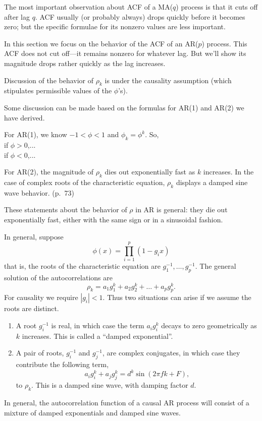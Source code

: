 \documentclass[12pt]{article}
\begin{document}
The most important observation about ACF of a MA($q$)
process is that it cuts off after lag $q$.
ACF usually (or probably always) drops quickly before it becomes zero;
but the specific formulae for its nonzero values are less important.

In this section we focus on the behavior of the ACF of an AR($p$)
process.
This ACF does not cut off---it remains nonzero for whatever lag.
But we'll show its magnitude drops rather quickly as the lag increases.

Discussion of the behavior of $\rho_k$ is under the causality assumption
(which stipulates permissible values of the $\phi$'s).

Some discussion can be made based on the formulas for
AR(1) and AR(2) we have derived.

For AR(1), we know $-1 < \phi < 1$ and $\phi_k = \phi^k$.
So,\\
if $\phi > 0$,...\\
if $\phi < 0$,...

For AR(2), the magnitude of $\rho_k$ dies out exponentially fast as $k$
increases. In the case of complex roots of the characteristic equation,
$\rho_k$ displays a damped sine wave behavior. (p.~73)

These statements about the behavior of $\rho$ in AR is general:
they die out exponentially fast,
either with the same sign or in a sinusoidal fashion.

In general,
suppose
\[
\phi(x) = \prod_{i=1}^p (1 - g_i x)
\]
that is,
the roots of the characteristic equation are
$g_1^{-1},\dotsc,g_p^{-1}$.
The general solution of the autocorrelations are
\[
\rho_k = a_1 g_1^k + a_2 g_2^k + \dotsc + a_p g_p^k.
\]
For causality we require $|g_i| < 1$.
Thus two situations can arise if we assume the roots are distinct.
\begin{enumerate}
\item A root $g_i^{-1}$ is real, in which case the term
    $a_i g_i^k$ decays to zero geometrically as $k$ increases.
    This is called a ``damped exponential''.
\item A pair of roots, $g_i^{-1}$ and $g_j^{-1}$, are complex
conjugates, in which case they contribute the following term,
\[
a_i g_i^k + a_j g_j^k
= d^k \sin (2\pi f k + F)
,
\]
to $\rho_k$.
This is a damped sine wave, with damping factor $d$.
\end{enumerate}
In general,
the autocorrelation function of a causal AR process will consist of a
mixture of damped exponentials and damped sine waves.
\end{document}

